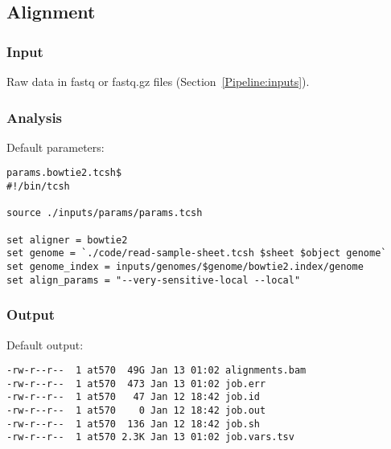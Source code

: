 \subsection{Alignment}\label{HiC:align} %
\subsubsection{Input} %
Raw data in fastq or fastq.gz files (Section~\ref{Pipeline:inputs}). 
\subsubsection{Analysis} %
Default parameters:
\begin{lstlisting}
params.bowtie2.tcsh$
#!/bin/tcsh

source ./inputs/params/params.tcsh

set aligner = bowtie2
set genome = `./code/read-sample-sheet.tcsh $sheet $object genome`
set genome_index = inputs/genomes/$genome/bowtie2.index/genome
set align_params = "--very-sensitive-local --local"
\end{lstlisting}
\subsubsection{Output} %
Default output: %
\begin{lstlisting}
-rw-r--r--  1 at570  49G Jan 13 01:02 alignments.bam
-rw-r--r--  1 at570  473 Jan 13 01:02 job.err
-rw-r--r--  1 at570   47 Jan 12 18:42 job.id
-rw-r--r--  1 at570    0 Jan 12 18:42 job.out
-rw-r--r--  1 at570  136 Jan 12 18:42 job.sh
-rw-r--r--  1 at570 2.3K Jan 13 01:02 job.vars.tsv
\end{lstlisting}
% 
\clearpage 